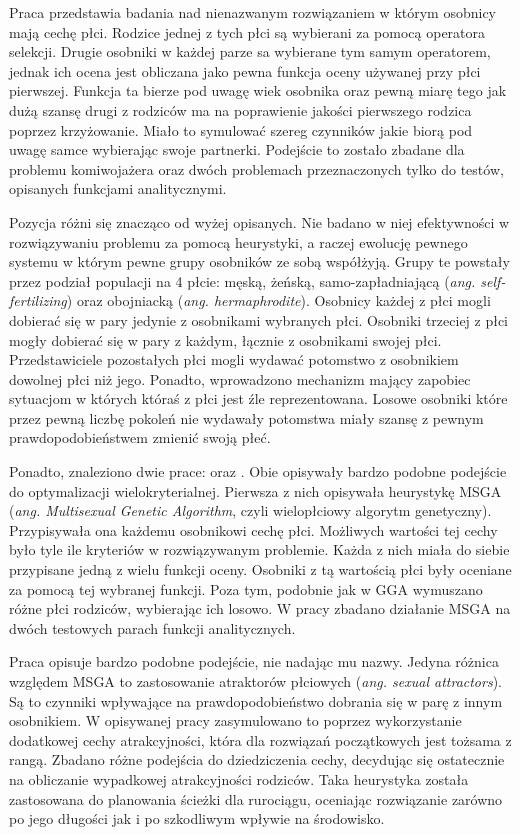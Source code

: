 \documentclass[./FM_mgr.tex]{subfiles}
\begin{document}
Praca \cite{sanchez} przedstawia badania nad nienazwanym rozwiązaniem w którym osobnicy mają cechę płci.
Rodzice jednej z tych płci są wybierani za pomocą operatora selekcji. 
Drugie osobniki w każdej parze sa wybierane tym samym operatorem, jednak ich ocena jest obliczana jako pewna funkcja oceny używanej przy płci pierwszej.
Funkcja ta bierze pod uwagę wiek osobnika oraz pewną miarę tego jak dużą szansę drugi z rodziców ma na poprawienie jakości pierwszego rodzica poprzez krzyżowanie.
Miało to symulować szereg czynników jakie biorą pod uwagę samce wybierając swoje partnerki.
Podejście to zostało zbadane dla problemu komiwojażera oraz dwóch problemach przeznaczonych tylko do testów, opisanych funkcjami analitycznymi.

Pozycja \cite{simulating} różni się znacząco od wyżej opisanych.
Nie badano w niej efektywności w rozwiązywaniu problemu za pomocą heurystyki, a raczej ewolucję pewnego systemu w którym pewne grupy osobników ze sobą współżyją.
Grupy te powstały przez podział populacji na 4 płcie: męską, żeńską, samo-zapładniającą (\emph{ang. self-fertilizing}) oraz obojniacką (\emph{ang. hermaphrodite}).
Osobnicy każdej z płci mogli dobierać się w pary jedynie z osobnikami wybranych płci.
Osobniki trzeciej z płci mogły dobierać się w pary z każdym, łącznie z osobnikami swojej płci.
Przedstawiciele pozostałych płci mogli wydawać potomstwo z osobnikiem dowolnej płci niż jego.
Ponadto, wprowadzono mechanizm mający zapobiec sytuacjom w których któraś z płci jest źle reprezentowana.
Losowe osobniki które przez pewną liczbę pokoleń nie wydawały potomstwa miały szansę z pewnym prawdopodobieństwem zmienić swoją płeć.

Ponadto, znaleziono dwie prace: \cite{msga} oraz \cite{allenson}.
Obie opisywały bardzo podobne podejście do optymalizacji wielokryterialnej.
Pierwsza z nich opisywała heurystykę MSGA (\emph{ang. Multisexual Genetic Algorithm}, czyli wielopłciowy algorytm genetyczny).
Przypisywała ona każdemu osobnikowi cechę płci.
Możliwych wartości tej cechy było tyle ile kryteriów w rozwiązywanym problemie.
Każda z nich miała do siebie przypisane jedną z wielu funkcji oceny.
Osobniki z tą wartością płci były oceniane za pomocą tej wybranej funkcji.
Poza tym, podobnie jak w GGA wymuszano różne płci rodziców, wybierając ich losowo.
W pracy \cite{msga} zbadano działanie MSGA na dwóch testowych parach funkcji analitycznych.

Praca \cite{allenson} opisuje bardzo podobne podejście, nie nadając mu nazwy.
Jedyna różnica względem MSGA to zastosowanie atraktorów płciowych (\emph{ang. sexual attractors}).
Są to czynniki wpływające na prawdopodobieństwo dobrania się w parę z innym osobnikiem.
W opisywanej pracy zasymulowano to poprzez wykorzystanie dodatkowej cechy atrakcyjności, która dla rozwiązań początkowych jest tożsama z rangą.
Zbadano różne podejścia do dziedziczenia cechy, decydując się ostatecznie na obliczanie wypadkowej atrakcyjności rodziców.
Taka heurystyka została zastosowana do planowania ścieżki dla rurociągu, oceniając rozwiązanie zarówno po jego długości jak i po szkodliwym wpływie na środowisko.
\end{document}
